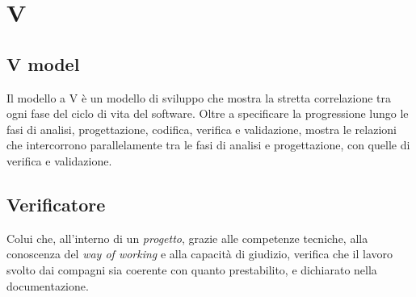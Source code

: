 \chapter{V}

\section{V model}
Il modello a V è un modello di sviluppo che mostra la stretta correlazione tra ogni fase del ciclo di vita del software. Oltre a specificare la progressione lungo le fasi di analisi, progettazione, codifica, verifica e validazione, mostra le relazioni che intercorrono parallelamente tra le fasi di analisi e progettazione, con quelle di verifica e validazione.

\section{Verificatore}\label{sec:Verificatori}
Colui che, all'interno di un \emph{progetto}, grazie alle competenze tecniche, alla conoscenza del \emph{way of working} e alla capacità di giudizio, verifica che il lavoro svolto dai compagni sia coerente con quanto prestabilito, e dichiarato nella documentazione.
